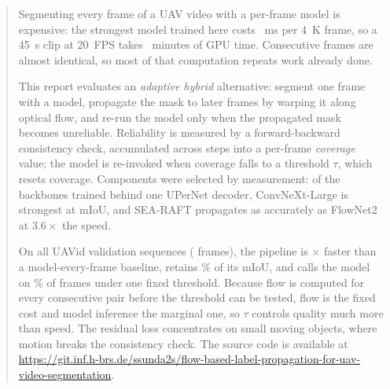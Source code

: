 \documentclass[report.tex]{subfiles}
\begin{document}
\begin{abstract}
Segmenting every frame of a UAV video with a per-frame model is expensive: the
strongest model trained here costs \LatTypical~ms per \SI{4}{K} frame, so a
\SI{45}{s} clip at \SI{20}{FPS} takes \ClipMinutes~minutes of GPU time.
Consecutive frames are almost identical, so most of that computation repeats
work already done.

This report evaluates an \emph{adaptive hybrid} alternative: segment one frame
with a model, propagate the mask to later frames by warping it along optical
flow, and re-run the model only when the propagated mask becomes unreliable.
Reliability is measured by a forward-backward consistency check, accumulated
across steps into a per-frame \emph{coverage} value; the model is re-invoked
when coverage falls to a threshold $\tau$, which resets coverage. Components
were selected by measurement: of the backbones trained behind one UPerNet
decoder, ConvNeXt-Large is strongest at \MIoUConvnextLarge{} mIoU, and SEA-RAFT
propagates as accurately as FlowNet2 at $3.6\times$ the speed.

On all \NumSeq{} UAVid validation sequences (\NumFrames{} frames), the pipeline
is \Speedup$\times$ faster than a model-every-frame baseline, retains
\Retention\% of its mIoU, and calls the model on \PctModel\% of frames under
one fixed threshold. Because flow is computed for every consecutive pair before
the threshold can be tested, flow is the fixed cost and model inference the
marginal one, so $\tau$ controls quality much more than speed. The residual
loss concentrates on small moving objects, where motion breaks the consistency
check. The source code is available at
\url{https://git.inf.h-brs.de/ssunda2s/flow-based-label-propagation-for-uav-video-segmentation}.
\end{abstract}
\end{document}
